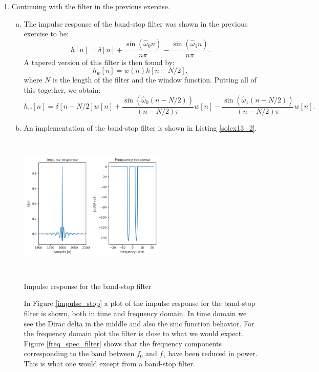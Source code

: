\begin{enumerate}
  \item Continuing with the filter in the previous exercise.

        \begin{enumerate}[a)]
          \item The impulse response of the band-stop filter was shown in the previous exercise to be:
                \[ h[n] = \delta[n] + \frac{\sin(\hat{\omega}_{0}n)}{n\pi} - \frac{\sin(\hat{\omega}_{1}n)}{n\pi}. \]
                A tapered version of this filter is then found by:
                \[ h_{w}[n] = w(n)h[n - N/2], \]
                where $N$ is the length of the filter and the window function. Putting all of this together, we obtain:
                \[ h_{w}[n] = \delta[n-N/2]w[n] + \frac{\sin(\hat{\omega}_{0}(n-N/2))}{(n-N/2)\pi}w[n] - \frac{\sin(\hat{\omega}_{1}(n-N/2))}{(n-N/2)\pi}w[n]. \]

          \item An implementation of the band-stop filter is shown in Listing \ref{solex13_2}.

                
                \begin{marginfigure}
                  \includegraphics[width=7.0cm,height=6.8cm]{ch13/figures/impulse_response.png}
                  \caption{Impulse response for the band-stop filter}
                  \label{impulse_stop}
                \end{marginfigure}

                In Figure \ref{impulse_stop} a plot of the impulse response for the band-stop filter is shown, both in time and frequency domain.
                In time domain we see the Dirac delta in the middle and also the sinc function behavior.
                For the frequency domain plot the filter is close to what we would expect. Figure \ref{freq_spec_filter} shows that the
                frequency components corresponding to the band between $f_{0}$ and $f_{1}$ have been
                reduced in power. This is what one would except from a band-stop filter.


\end{enumerate}
\end{enumerate}
